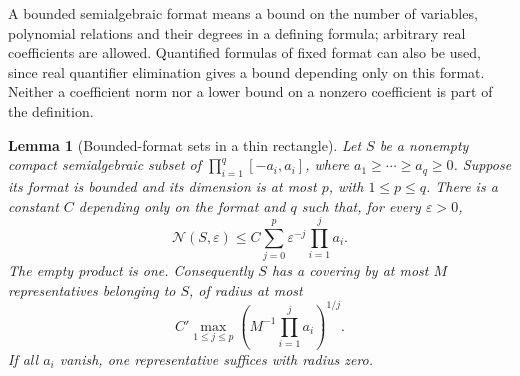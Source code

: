 \documentclass[11pt]{amsart}
\newtheorem{lemma}[theorem]{Lemma}
\theoremstyle{definition}\newtheorem{definition}[theorem]{Definition}
\theoremstyle{remark}\newtheorem{remark}[theorem]{Remark}
\begin{document}
A bounded semialgebraic format means a bound on the number of variables,
polynomial relations and their degrees in a defining formula; arbitrary
real coefficients are allowed. Quantified formulas of fixed format can
also be used, since real quantifier elimination gives a bound depending
only on this format. Neither a coefficient norm nor a lower bound on a
nonzero coefficient is part of the definition.

\begin{lemma}[Bounded-format sets in a thin rectangle]\label{lem:tame-rectangle}
Let $S$ be a nonempty compact semialgebraic subset of
$\prod_{i=1}^{q}[-a_i,a_i]$, where $a_1\ge\cdots\ge a_q\ge0$.
Suppose its format is bounded and its dimension is at most $p$, with
$1\le p\le q$. There is a constant $C$ depending only on the format
and $q$ such that, for every $\varepsilon>0$,
\begin{equation}\label{eq:tame-cover-count}
 \mathcal N(S,\varepsilon)
 \le C\sum_{j=0}^{p}\varepsilon^{-j}\prod_{i=1}^{j}a_i.
\end{equation}
The empty product is one. Consequently $S$ has a covering by at most
$M$ representatives belonging to $S$, of radius at most
\begin{equation}\label{eq:tame-cover-radius}
 C'\max_{1\le j\le p}
           \left(M^{-1}\prod_{i=1}^{j}a_i\right)^{1/j}.
\end{equation}
If all $a_i$ vanish, one representative suffices with radius zero.
\end{lemma}
\end{document}
